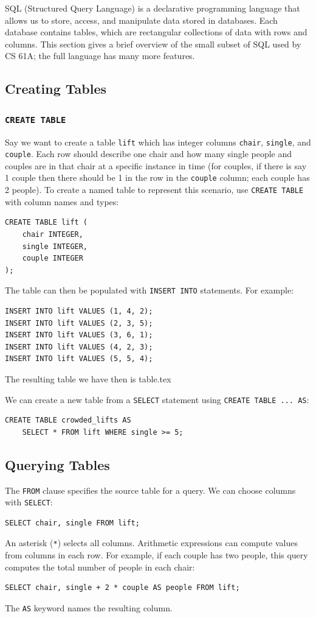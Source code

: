 SQL (Structured Query Language) is a declarative programming language that allows us to store, access, and manipulate data stored in databases. Each database contains tables, which are rectangular collections of data with rows and columns. This section gives a brief overview of the small subset of SQL used by CS 61A; the full language has many more features.

\subsection{Creating Tables}
\subsubsection{\lstinline{CREATE TABLE}}
Say we want to create a table \lstinline{lift} which has integer columns \lstinline{chair}, \lstinline{single}, and \lstinline{couple}. 
Each row should describe one chair and how many single people and couples are in that chair at a specific instance in time (for couples, if there is say 1 couple then there should be 1 in the row in the \lstinline{couple} column; each couple has 2 people). 
To create a named table to represent this scenario, use \lstinline{CREATE TABLE} with column names and types:
\begin{lstlisting}
CREATE TABLE lift (
    chair INTEGER,
    single INTEGER,
    couple INTEGER
);
\end{lstlisting}

The table can then be populated with \lstinline{INSERT INTO} statements. For example:
\begin{lstlisting}
INSERT INTO lift VALUES (1, 4, 2);
INSERT INTO lift VALUES (2, 3, 5);
INSERT INTO lift VALUES (3, 6, 1);
INSERT INTO lift VALUES (4, 2, 3);
INSERT INTO lift VALUES (5, 5, 4);
\end{lstlisting}

The resulting table we have then is {table.tex}

We can create a new table from a \lstinline{SELECT} statement using \lstinline{CREATE TABLE ... AS}:
\begin{lstlisting}
CREATE TABLE crowded_lifts AS
    SELECT * FROM lift WHERE single >= 5;
\end{lstlisting}

\newpage
\subsection{Querying Tables}
The \lstinline{FROM} clause specifies the source table for a query. We can choose columns with \lstinline{SELECT}:
\begin{lstlisting}
SELECT chair, single FROM lift;
\end{lstlisting}
An asterisk (\lstinline{*}) selects all columns. Arithmetic expressions can compute values from columns in each row. For example, if each couple has two people, this query computes the total number of people in each chair:
\begin{lstlisting}
SELECT chair, single + 2 * couple AS people FROM lift;
\end{lstlisting}
The \lstinline{AS} keyword names the resulting column.

